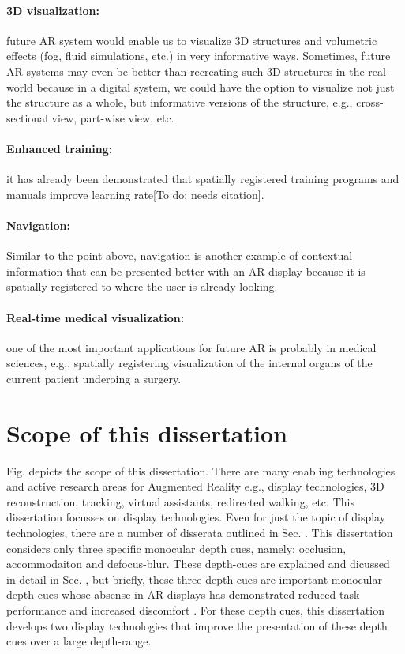 \paragraph{3D visualization:} future AR system would enable us to visualize 3D structures and volumetric effects (fog, fluid simulations, etc.) in very informative ways. 
Sometimes, future AR systems may even be better than recreating such 3D structures in the real-world because in a digital system, we could have the option to visualize not just the structure as a whole, but informative versions of the structure, e.g., cross-sectional view, part-wise view, etc. 
\paragraph{Enhanced training:} it has already been demonstrated that spatially registered training programs and manuals improve learning rate[To do: needs citation]. 
\paragraph{Navigation:} Similar to the point above, navigation is another example of contextual information that can be presented better with an AR display because it is spatially registered to where the user is already looking.
\paragraph{Real-time medical visualization:} one of the most important applications for future AR is probably in medical sciences, e.g., spatially registering visualization of the internal organs of the current patient underoing a surgery.

\section{Scope of this dissertation}

Fig.  depicts the scope of this dissertation. 
There are many enabling technologies and active research areas for Augmented Reality e.g., display technologies, 3D reconstruction, tracking, virtual assistants, redirected walking, etc. 
This dissertation focusses on display technologies. 
Even for just the topic of display technologies, there are a number of disserata outlined in Sec. . 
This dissertation considers only three specific monocular depth cues, namely: occlusion, accommodaiton and defocus-blur. 
These depth-cues are explained and dicussed in-detail in Sec. , but briefly, these three depth cues are important monocular depth cues whose absense in AR displays has demonstrated reduced task performance  and increased discomfort . 
For these depth cues, this dissertation develops two display technologies that improve the presentation of these depth cues over a large depth-range.


